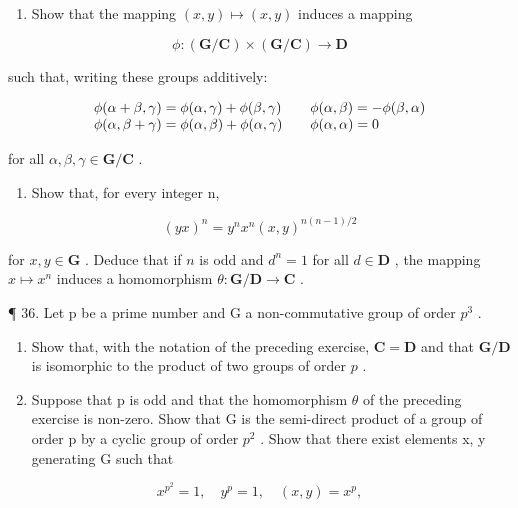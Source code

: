 \begin{enumerate}
\def\labelenumi{(\alph{enumi})}
\tightlist
\item
  Show that the mapping \((x,y)\mapsto (x,y)\) induces a mapping
\end{enumerate}

\[
\phi \colon (\mathbf {G} / \mathbf {C}) \times (\mathbf {G} / \mathbf {C}) \rightarrow \mathbf {D}
\]

such that, writing these groups additively:

\[
\begin{array}{l l} \phi (\alpha + \beta , \gamma) = \phi (\alpha , \gamma) + \phi (\beta , \gamma) & \quad \phi (\alpha , \beta) = - \phi (\beta , \alpha) \\ \phi (\alpha , \beta + \gamma) = \phi (\alpha , \beta) + \phi (\alpha , \gamma) & \quad \phi (\alpha , \alpha) = 0 \end{array}
\]

for all \(\alpha, \beta, \gamma \in \mathbf{G} / \mathbf{C}\) .

\begin{enumerate}
\def\labelenumi{(\alph{enumi})}
\setcounter{enumi}{1}
\tightlist
\item
  Show that, for every integer n,
\end{enumerate}

\[
(y x) ^ {n} = y ^ {n} x ^ {n} (x, y) ^ {n (n - 1) / 2}
\]

for \(x, y \in \mathbf{G}\) . Deduce that if \(n\) is odd and \(d^n = 1\) for all \(d \in \mathbf{D}\) , the mapping \(x \mapsto x^n\) induces a homomorphism \(\theta: \mathbf{G} / \mathbf{D} \to \mathbf{C}\) .

¶ 36. Let p be a prime number and G a non-commutative group of order \(p^{3}\) .

\begin{enumerate}
\def\labelenumi{(\alph{enumi})}
\item
  Show that, with the notation of the preceding exercise, \(\mathbf{C} = \mathbf{D}\) and that \(\mathbf{G} / \mathbf{D}\) is isomorphic to the product of two groups of order \(p\) .
\item
  Suppose that p is odd and that the homomorphism \(\theta\) of the preceding exercise is non-zero. Show that G is the semi-direct product of a group of order p by a cyclic group of order \(p^{2}\) . Show that there exist elements x, y generating G such that
\end{enumerate}

\[
x ^ {p ^ {2}} = 1, \quad y ^ {p} = 1, \quad (x, y) = x ^ {p},
\]

